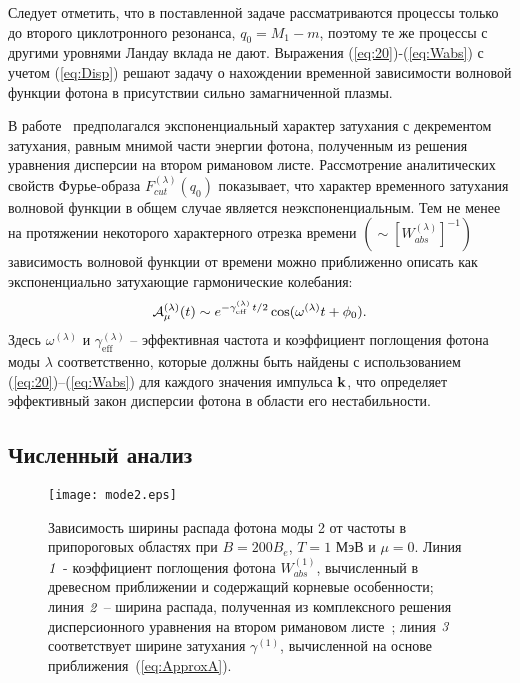 Следует отметить, что в поставленной задаче рассматриваются процессы только до 
второго циклотронного резонанса, $q_0=M_1-m$, поэтому те же процессы с другими 
уровнями Ландау вклада не дают.
Выражения (\ref{eq:20})-(\ref{eq:Wabs}) с учетом (\ref{eq:Disp}) решают задачу 
о нахождении временной зависимости волновой функции фотона  в присутствии сильно 
замагниченной плазмы. 

В работе~\cite{Shabad:1988}
предполагался экспоненциальный характер затухания с декрементом затухания, 
равным мнимой части энергии фотона, полученным из решения уравнения дисперсии 
на втором римановом листе. Рассмотрение  аналитических свойств Фурье-образа 
$F^{(\lambda)}_{cut}(q_0)$ показывает, что характер временного затухания 
волновой функции в общем случае является неэкспоненциальным. Тем не менее на 
протяжении некоторого характерного отрезка времени $(\sim 
[W^{(\lambda)}_{abs}]^{-1})$
зависимость волновой функции от времени можно приближенно описать как 
экспоненциально затухающие гармонические колебания:
%
\begin{equation}\label{eq:ApproxA}
{\cal A}^{(\lambda)}_\mu(t) \sim e^{- \gamma^{(\lambda)}_\text{eff} \, t/2} \cos 
(\omega^{(\lambda)} t + \phi_0).
\end{equation}
%
Здесь $\omega^{(\lambda)}$ и $\gamma^{(\lambda)}_\text{eff}$ -- эффективная 
частота и коэффициент  
поглощения фотона моды $\lambda$ соответственно, которые должны быть найдены с использованием 
(\ref{eq:20})--(\ref{eq:Wabs}) для каждого значения импульса ${\bf k}$, что определяет эффективный 
закон дисперсии фотона в области его нестабильности.


\subsection{Численный анализ}


\begin{figure}[t]\centering
	\texttt{[image: mode2.eps]}
	\caption{\label{fig:fig2}Зависимость ширины распада фотона моды 2 от частоты в припороговых областях при $B=200 B_e$, $T=1$ МэВ и $ \mu=0 $. Линия $ {\it 1} $ - коэффициент поглощения фотона $ W ^ {(1)}_{abs} $,
		вычисленный в древесном приближении и содержащий корневые особенности; линия $ {\it 2} $ -- ширина распада, полученная из комплексного решения дисперсионного уравнения на втором римановом листе~\cite{Shabad:1988}; линия $ {\it 3} $ соответствует ширине затухания $ \gamma^{(1)}$, вычисленной на основе приближения~(\ref{eq:ApproxA}).}\label{fig:DampMode2}
\end{figure}

